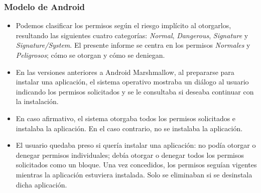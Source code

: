 \begin{frame}
 \frametitle{Modelo de Android}
 \begin{itemize}
  \item Podemos clasificar los permisos según el riesgo implícito al otorgarlos, resultando las siguientes cuatro categorías: \emph{Normal}, \emph{Dangerous}, \emph{Signature} y \emph{Signature/System}. \pause El presente informe se centra en los permisos \emph{Normales} y \emph{Peligrosos}; cómo se otorgan y cómo se deniegan.\pause
  \item En las versiones anteriores a Android Marshmallow, al prepararse para instalar una aplicación, el sistema operativo mostraba un diálogo al usuario indicando los permisos solicitados y se le consultaba si deseaba continuar con la instalación.\pause
  \item En caso afirmativo, el sistema otorgaba todos los permisos solicitados e instalaba la aplicación. \pause En el caso contrario, no se instalaba la aplicación.\pause
  \item El usuario quedaba preso si quería instalar una aplicación: no podía otorgar o denegar permisos individuales; debía otorgar o denegar todos los permisos solicitados como un bloque. \pause Una vez concedidos, los permisos seguían vigentes mientras la aplicación estuviera instalada. Solo se eliminaban si se desinstala dicha aplicación.
 \end{itemize}
\end{frame}

